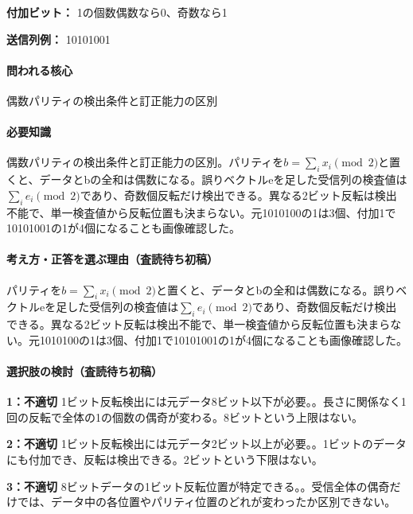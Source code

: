\noindent\textbf{付加ビット：} 1の個数偶数なら0、奇数なら1\par

\noindent\textbf{送信列例：} 10101001\par

\paragraph{問われる核心} 偶数パリティの検出条件と訂正能力の区別

\paragraph{必要知識} 偶数パリティの検出条件と訂正能力の区別。パリティを\(b=\sum_ix_i\pmod2\)と置くと、データとbの全和は偶数になる。誤りベクトルeを足した受信列の検査値は\(\sum_ie_i\pmod2\)であり、奇数個反転だけ検出できる。異なる2ビット反転は検出不能で、単一検査値から反転位置も決まらない。元1010100の1は3個、付加1で10101001の1が4個になることも画像確認した。

\paragraph{考え方・正答を選ぶ理由（査読待ち初稿）} パリティを\(b=\sum_ix_i\pmod2\)と置くと、データとbの全和は偶数になる。誤りベクトルeを足した受信列の検査値は\(\sum_ie_i\pmod2\)であり、奇数個反転だけ検出できる。異なる2ビット反転は検出不能で、単一検査値から反転位置も決まらない。元1010100の1は3個、付加1で10101001の1が4個になることも画像確認した。

\paragraph{選択肢の検討（査読待ち初稿）}\mbox{}\par

\noindent\textbf{1：不適切} 1ビット反転検出には元データ8ビット以下が必要。。長さに関係なく1回の反転で全体の1の個数の偶奇が変わる。8ビットという上限はない。\par

\noindent\textbf{2：不適切} 1ビット反転検出には元データ2ビット以上が必要。。1ビットのデータにも付加でき、反転は検出できる。2ビットという下限はない。\par

\noindent\textbf{3：不適切} 8ビットデータの1ビット反転位置が特定できる。。受信全体の偶奇だけでは、データ中の各位置やパリティ位置のどれが変わったか区別できない。\par

